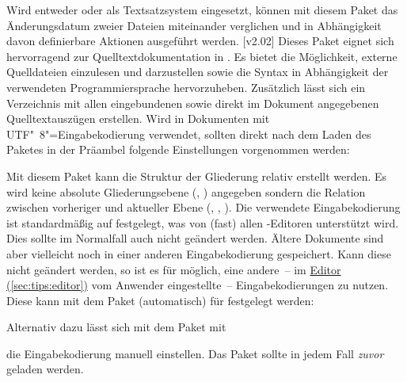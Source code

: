 \begin{DeclarePackages}
  Wird entweder  oder  als Textsatzsystem 
  eingesetzt, können mit diesem Paket das Änderungsdatum zweier Dateien 
  miteinander verglichen und in Abhängigkeit davon definierbare Aktionen 
  ausgeführt werden.
[v2.02]
  Dieses Paket eignet sich hervorragend zur Quelltextdokumentation in 
  . Es bietet die Möglichkeit, externe Quelldateien einzulesen 
  und darzustellen sowie die Syntax in Abhängigkeit der verwendeten 
  Programmiersprache hervorzuheben. Zusätzlich lässt sich ein Verzeichnis mit 
  allen eingebundenen sowie direkt im Dokument angegebenen Quelltextauszügen 
  erstellen. Wird  in Dokumenten mit UTF"~8"=Eingabekodierung 
  verwendet, sollten direkt nach dem Laden des Paketes in der Präambel folgende 
  Einstellungen vorgenommen werden:
  \begin{Code}
  \end{Code}\vspace{-\baselineskip}%
  Mit diesem Paket kann die Struktur der Gliederung relativ erstellt werden. 
  Es wird keine absolute Gliederungsebene (, ) 
  angegeben sondern die Relation zwischen vorheriger und aktueller Ebene 
  (, , ).
  Die verwendete Eingabekodierung ist standardmäßig auf 
  festgelegt, was von (fast) allen -Editoren unterstützt wird. 
  Dies sollte im Normalfall auch nicht geändert werden. Ältere Dokumente sind 
  aber vielleicht noch in einer anderen Eingabekodierung gespeichert. Kann 
  diese nicht geändert werden, so ist es für  möglich, eine 
  andere~-- im \hyperref[sec:tips:editor]{Editor (\autoref*{sec:tips:editor})} 
  vom Anwender eingestellte~-- Eingabekodierungen zu nutzen. Diese kann mit dem 
  Paket  (automatisch) für  festgelegt werden:
  \begin{Code}
    \usepackage{selinput}
  \end{Code}\vspace{-\baselineskip}%
  Alternativ dazu lässt sich mit dem Paket  mit
  \vspace{-\baselineskip}%
  die Eingabekodierung manuell einstellen. Das Paket  sollte 
  in jedem Fall \emph{zuvor} geladen werden.
\end{DeclarePackages}



